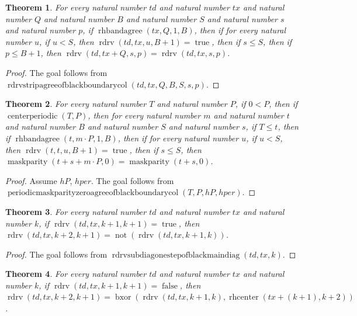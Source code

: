 \documentclass[11pt]{article}
\newtheorem{theorem}{Theorem}[section]
\theoremstyle{definition}
\begin{document}
\begin{theorem}
\label{ll:paper:rdrv-strip-agree-of-black-boundary-col}
For every natural number \(td\) and natural number \(tx\) and natural number \(Q\) and natural number \(B\) and natural number \(S\) and natural number \(s\) and natural number \(p\), if \(\operatorname{rhbandagree}(tx, Q, 1, B)\), then if for every natural number \(u\), if \(u < S\), then \(\operatorname{rdrv}(td, tx, u, B + 1) = \operatorname{true}\), then if \(s \le S\), then if \(p \le B + 1\), then \(\operatorname{rdrv}(td, tx + Q, s, p) = \operatorname{rdrv}(td, tx, s, p)\).
\end{theorem}
\begin{proof}
The goal follows from \(\operatorname{rdrvstripagreeofblackboundarycol}(td, tx, Q, B, S, s, p)\).
\end{proof}
\begin{theorem}
\label{ll:paper:periodic-maskparity-zero-agree-of-black-boundary-col}
For every natural number \(T\) and natural number \(P\), if \(0 < P\), then if \(\operatorname{centerperiodic}(T, P)\), then for every natural number \(m\) and natural number \(t\) and natural number \(B\) and natural number \(S\) and natural number \(s\), if \(T \le t\), then if \(\operatorname{rhbandagree}(t, m \cdot P, 1, B)\), then if for every natural number \(u\), if \(u < S\), then \(\operatorname{rdrv}(t, t, u, B + 1) = \operatorname{true}\), then if \(s \le S\), then \(\operatorname{maskparity}(t + s + m \cdot P, 0) = \operatorname{maskparity}(t + s, 0)\).
\end{theorem}
\begin{proof}
Assume \(hP\), \(hper\).
The goal follows from \(\operatorname{periodicmaskparityzeroagreeofblackboundarycol}(T, P, hP, hper)\).
\end{proof}
\begin{theorem}
\label{ll:paper:rdrv-subdiag-one-step-of-black-main-diag}
For every natural number \(td\) and natural number \(tx\) and natural number \(k\), if \(\operatorname{rdrv}(td, tx, k + 1, k + 1) = \operatorname{true}\), then \(\operatorname{rdrv}(td, tx, k + 2, k + 1) = \operatorname{not}(\operatorname{rdrv}(td, tx, k + 1, k))\).
\end{theorem}
\begin{proof}
The goal follows from \(\operatorname{rdrvsubdiagonestepofblackmaindiag}(td, tx, k)\).
\end{proof}
\begin{theorem}
\label{ll:paper:rdrv-subdiag-one-step-of-white-main-diag}
For every natural number \(td\) and natural number \(tx\) and natural number \(k\), if \(\operatorname{rdrv}(td, tx, k + 1, k + 1) = \operatorname{false}\), then \(\operatorname{rdrv}(td, tx, k + 2, k + 1) = \operatorname{bxor}(\operatorname{rdrv}(td, tx, k + 1, k), \operatorname{rhcenter}(tx + (k + 1), k + 2))\).
\end{theorem}
\end{document}

